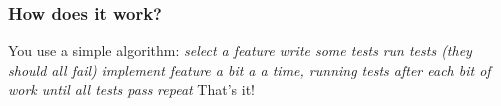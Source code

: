 \documentclass[t, 10pt]{beamer}
\begin{document}
\begin{frame}
\frametitle{How does it work?}
You use a simple algorithm:
\newline
\newline
\textit{select a feature}
\newline
\newline
\pause
\textit{write some tests}
\newline
\newline
\pause
\textit{run tests (they should all fail)}
\newline
\newline
\pause
\textit{implement feature a bit a a time, running tests after each bit of work until all tests pass}
\newline
\newline
\pause
\textit{repeat}
\newline
\newline
\pause
That's it!
\end{frame}

\begin{frame}
\frametitle{}
\end{frame}
\end{document}
